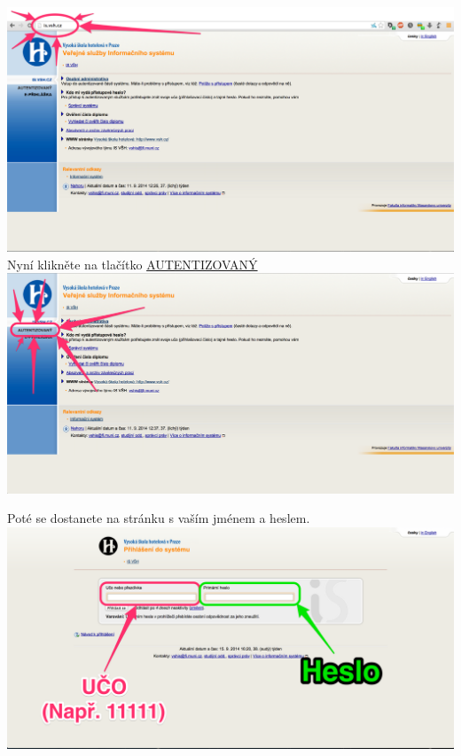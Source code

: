 \documentclass[a4paper,12pt]{article}
\begin{document}
\includegraphics[width=\textwidth]{s01} \\

Nyní klikněte na tlačítko \href{http://is.vsh.cz/auth}{AUTENTIZOVANÝ} \\

\includegraphics[width=\textwidth]{s02} \\

\newpage

Poté se dostanete na stránku s vaším jménem a heslem. \\

\includegraphics[width=\textwidth]{s03-1} \\
\end{document}
